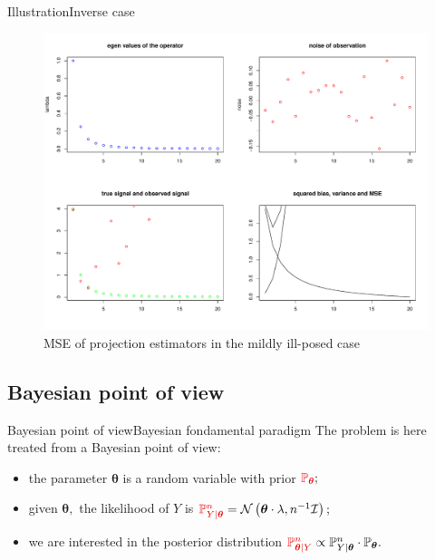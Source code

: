 \documentclass[10pt]{beamer}
\begin{document}
\begin{frame}{Illustration}{Inverse case}
\begin{figure}
\centering
 \includegraphics[width=.8\linewidth]{mildly-illposed.pdf}
\caption{MSE of projection estimators in the mildly ill-posed case}\label{MIP}
\end{figure}
\end{frame}

\subsection{Bayesian point of view}
\begin{frame}{Bayesian point of view}{Bayesian fondamental paradigm}
The problem is here treated from a Bayesian point of view:

\bigskip

\begin{itemize}
\setlength\itemsep{3em}
\item<1-> the parameter $\boldsymbol{\theta}$ is a random variable with \textcolor{red!90!black}{prior} $\textcolor{red!90!black}{\mathbb{P}_{\boldsymbol{\theta}}};$
\item<2-> given $\boldsymbol{\theta},$ the \textcolor{red!90!black}{likelihood} of $Y$ is $\textcolor{red!90!black}{\mathbb{P}_{Y \vert \boldsymbol{\theta}}^{n}} = \mathcal{N}\left(\boldsymbol{\theta} \cdot \lambda, n^{-1} \mathcal{I}\right);$
\item<3-> we are interested in the \textcolor{red!90!black}{posterior distribution} $\textcolor{red!90!black}{\mathbb{P}_{\boldsymbol{\theta} \vert Y}^{n}} \propto \mathbb{P}_{Y \vert \boldsymbol{\theta}}^{n} \cdot \mathbb{P}_{\boldsymbol{\theta}}.$
\end{itemize}
\end{frame}
\end{document}
